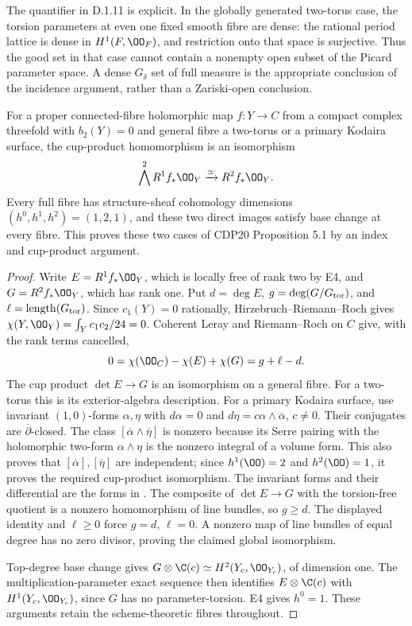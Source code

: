 The quantifier in D.1.11 is explicit. In the globally generated
two-torus case, the torsion parameters at even one fixed smooth fibre are
dense: the rational period lattice is dense in
$H^1(F,\OO_F)$, and restriction onto that space is surjective.
Thus the good set in that case cannot contain a nonempty open
subset of the Picard parameter space. A dense $G_\delta$ set of
full measure is the appropriate conclusion of the incidence
argument, rather than a Zariski-open conclusion.

\begin{proposition}[D.1.12; Proved]\label{st:D.1.12}
For a proper connected-fibre holomorphic map $f:Y\to C$ from a
compact complex threefold with $b_2(Y)=0$ and general fibre a
two-torus or a primary Kodaira surface, the cup-product homomorphism
is an isomorphism
\[
\bigwedge^2R^1f_*\OO_Y\xrightarrow{\simeq}R^2f_*\OO_Y.
\]
Every full fibre has structure-sheaf cohomology dimensions
$(h^0,h^1,h^2)=(1,2,1)$, and these two direct images satisfy
base change at every fibre. This proves these two cases of CDP20
Proposition 5.1 by an index and cup-product argument.
\end{proposition}
\begin{proof}
Write $E=R^1f_*\OO_Y$, which is locally free of rank two by E4,
and $G=R^2f_*\OO_Y$, which has rank one. Put
$d=\deg E$, $g=\deg(G/G_{\rm tor})$, and
$\ell=\operatorname{length}(G_{\rm tor})$.
Since $c_1(Y)=0$ rationally, Hirzebruch--Riemann--Roch gives
$\chi(Y,\OO_Y)=\int_Yc_1c_2/24=0$.
Coherent Leray and Riemann--Roch on $C$ give, with the rank terms
cancelled,
\[
0=\chi(\OO_C)-\chi(E)+\chi(G)=g+\ell-d.
\]
The cup product $\det E\to G$ is an isomorphism on a general
fibre. For a two-torus this is its exterior-algebra description.
For a primary Kodaira surface, use invariant $(1,0)$-forms
$\alpha,\eta$ with $d\alpha=0$ and
$d\eta=c\alpha\wedge\overline\alpha$, $c\ne0$.
Their conjugates are $\overline\partial$-closed. The class
$[\overline\alpha\wedge\overline\eta]$ is nonzero because its
Serre pairing with the holomorphic two-form $\alpha\wedge\eta$
is the nonzero integral of a volume form. This also proves that
$[\overline\alpha],[\overline\eta]$ are independent; since
$h^1(\OO)=2$ and $h^2(\OO)=1$, it proves the required cup-product
isomorphism. The invariant forms and their differential are
the forms in \cite[\S3, equations (9)--(12)]{Borcea1984}.
The composite of $\det E\to G$ with the torsion-free quotient is a
nonzero homomorphism of line bundles, so $g\geq d$. The displayed
identity and $\ell\geq0$ force $g=d$, $\ell=0$. A nonzero map
of line bundles of equal degree has no zero divisor, proving the
claimed global isomorphism.

Top-degree base change gives
$G\otimes\C(c)\simeq H^2(Y_c,\OO_{Y_c})$, of dimension one.
The multiplication-parameter exact sequence then identifies
$E\otimes\C(c)$ with $H^1(Y_c,\OO_{Y_c})$, since $G$ has no
parameter-torsion. E4 gives $h^0=1$. These arguments retain the
scheme-theoretic fibres throughout.
\end{proof}

